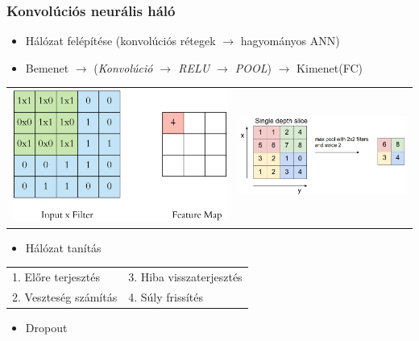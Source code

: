\documentclass{beamer}
\begin{document}
\begin{frame}[fragile]
\frametitle{Konvolúciós neurális háló}
\begin{itemize}
\item Hálózat felépítése (konvolúciós rétegek $\rightarrow$ hagyományos ANN)
\item Bemenet $\rightarrow$ (\textit{Konvolúció $\rightarrow$ RELU $\rightarrow$ POOL}) $\rightarrow$ Kimenet(FC)
\end{itemize}
\begin{tabular}{c c}
\includegraphics[scale=0.15]{convolution} & \includegraphics[scale=0.2]{maxpool}
\end{tabular}
\begin{itemize}
\item Hálózat tanítás
\end{itemize}
\begin{table}
\centering
\begin{tabular}{l l}
	1. Előre terjesztés & 3. Hiba visszaterjesztés\\
	2. Veszteség számítás & 4. Súly frissítés
\end{tabular}
\end{table}
\begin{itemize}
\item Dropout
\end{itemize}
\end{frame}
\end{document}
